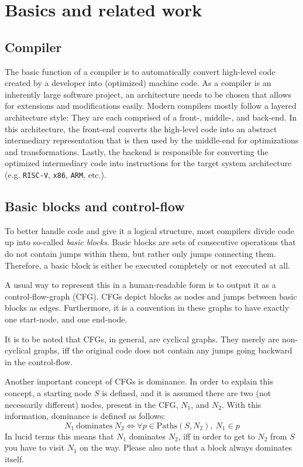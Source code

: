 \chapter{Basics and related work}\label{sec:basics}

\section{Compiler}\label{sec:basics:compiler}

The basic function of a compiler is to automatically convert high-level code created by a developer into (optimized) machine code.
As a compiler is an inherently large software project, an architecture needs to be chosen that allows for extensions and modifications easily.
Modern compilers mostly follow a layered architecture style: They are each comprised of a front-, middle-, and back-end.
In this architecture, the front-end converts the high-level code into an abstract intermediary representation that is then used by the middle-end for optimizations and transformations.
Lastly, the backend is responsible for converting the optimized intermediary code into instructions for the target system architecture (e.g. \texttt{RISC-V}, \texttt{x86}, \texttt{ARM}, etc.).

\section{Basic blocks and control-flow}\label{sec:basics:bb-cf}

To better handle code and give it a logical structure, most compilers divide code up into so-called \textit{basic blocks}.
Basic blocks are sets of consecutive operations that do not contain jumps within them, but rather only jumps connecting them.
Therefore, a basic block is either be executed completely or not executed at all.

A usual way to represent this in a human-readable form is to output it as a control-flow-graph (CFG).
CFGs depict blocks as nodes and jumps between basic blocks as edges.
Furthermore, it is a convention in these graphs to have exactly one start-node, and one end-node.

It is to be noted that CFGs, in general, are cyclical graphs.
They merely are non-cyclical graphs, iff the original code does not contain any jumps going backward in the control-flow.

Another important concept of CFGs is dominance.
In order to explain this concept, a starting node $S$ is defined, and it is assumed there are two (not necessarily different) nodes, present in the CFG, $N_1$, and $N_2$.
With this information, dominance is defined as follows:
$$N_1~\text{dominates}~N_2 \Longleftrightarrow \forall p \in \text{Paths}(S, N_2),~N_1 \in p$$
In lucid terms this means that $N_1$ dominates $N_2$, iff in order to get to $N_2$ from $S$ you have to visit $N_1$ on the way.
Please also note that a block always dominates itself.

